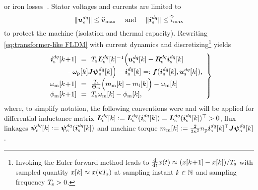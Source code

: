 \documentclass[journal]{IEEEtranTIE}
\begin{document}
or iron losses~\cite{2023_Rossmann_NonlinearThreePhaseReluctanceSynchronousMachineModelingwithExtendedTorqueEquation}. Stator voltages and currents are limited to \cite{2021_Hackl_GenericLossMinimizationforNonlinearSynchronousMachinesbyAnalyticalComputationofOptimalReferenceCurrentsConsideringCopperandIronLosses}
%
\begin{equation}
\norm{\usdq} \leq \usmax \quad \text{ and \quad } \norm{\isdq} \leq \ismax 
\label{eq:voltage and current constraints}
\end{equation}
%
to protect the machine (isolation and thermal capacity).
Rewriting \eqref{eq:transformer-like FLDM} with current dynamics and discretizing\footnote{Invoking the Euler forward method leads to $\tfrac{\mathrm{d}}{\mathrm{d}t} x(t) \approx (x[k\!+\!1] - x[k])/T_{\mathrm{s}}$ with sampled quantity $x[k]\approx x(kT_{\mathrm{s}})$ at sampling instant $k\in \mathbb{N}$ and sampling frequency $T_{\mathrm{s}}>0$.} yields
%
\begin{equation}
	\left.
	\begin{array}{rcl}
		\isdq[k\!+\!1] &\!\!=\!\!& \Ts\Lsdq[k]^{-1} \Big(\usdq[k] - \Rsdq\isdq[k] \\ 
& & \hspace{-8ex} - \omegaP[k]\J\psisdq[k]  \Big) - \isdq[k] =: \mv{f}(\isdq[k],\usdq[k]) ,  \\
        \omegaM[k\!+\!1] &\!\!=\!\!& \tfrac{\Ts}{\ThetaM}\Big( \mM[k]  - \mL[k] \Big) - \omegaM[k] \\
        \phiM[k\!+\!1] &\!\!=\!\!& \Ts \omegaM[k] - \phiM[k],
	\end{array}
	\right\}
	\label{eq:transformer-like CDM (discrete)}
\end{equation}
%
where, to simplify notation, the following conventions were and will be applied for differential inductance matrix $\boldsymbol{L}_{\mathrm{s}}^{dq}[k]:=\boldsymbol{L}_{\mathrm{s}}^{dq}(\boldsymbol{i}_{\mathrm{s}}^{dq}[k])=\boldsymbol{L}_{\mathrm{s}}^{dq}(\boldsymbol{i}_{\mathrm{s}}^{dq}[k])^\top>0$,  flux linkages $\boldsymbol{\psi}_{\mathrm{s}}^{dq}[k]:=\boldsymbol{\psi}_{\mathrm{s}}^{dq}(\boldsymbol{i}_{\mathrm{s}}^{dq}[k])$ and machine torque $m_{\mathrm{m}}[k]:= \tfrac{2}{3\kappa^2}n_{\mathrm{p}} \boldsymbol{i}_{\mathrm{s}}^{dq}[k]^\top\boldsymbol{J} \boldsymbol{\psi}_{\mathrm{s}}^{dq}[k]$.
%
\end{document}
